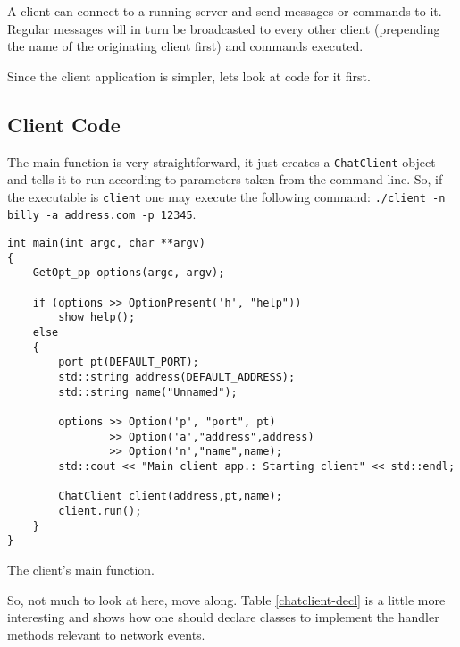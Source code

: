 \documentclass[a4paper,12pt,english]{article}
\begin{document}
A client can connect to a running server and send  messages or commands
to it. Regular messages will in  turn  be  broadcasted  to  every other
client (prepending the name of the originating client first) and commands
executed.

Since the client application is simpler, lets look at code for it first.

\subsection{Client Code}

The main function is very straightforward, it just creates a \texttt{ChatClient}
object and tells it to run according to parameters taken from the command
line. So, if the executable is \texttt{client} one may execute the
following command: \texttt{./client -n billy -a address.com -p 12345}.

\begin{table}[!htb]
\lstset{language=C++}
\begin{lstlisting}[frame=single]
int main(int argc, char **argv)
{
    GetOpt_pp options(argc, argv);

    if (options >> OptionPresent('h', "help"))
        show_help();
    else
    {
        port pt(DEFAULT_PORT);
        std::string address(DEFAULT_ADDRESS);
        std::string name("Unnamed");

        options >> Option('p', "port", pt) 
                >> Option('a',"address",address) 
                >> Option('n',"name",name);
        std::cout << "Main client app.: Starting client" << std::endl;

        ChatClient client(address,pt,name);
        client.run();
    }
}
\end{lstlisting}
\centering \caption{The client's main function.} 
\label{client-main}
\end{table}

So, not much to look at here, move along. Table \ref{chatclient-decl} is a little
more interesting and shows how one should declare classes to implement the
handler methods relevant to network events. 
\end{document}
